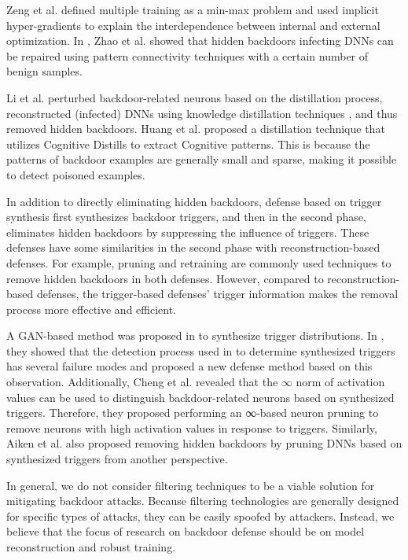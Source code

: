 \documentclass[conference]{IEEEtran}
\begin{document}
Zeng et al. \cite{b90}defined multiple training as a min-max problem and used implicit hyper-gradients to
explain the interdependence between internal and external optimization.
In \cite{b91}, Zhao et al. showed that hidden backdoors infecting DNNs can be repaired using pattern connectivity techniques with a certain number of benign samples.

Li et al. \cite{b92} perturbed backdoor-related neurons based on the distillation process, reconstructed (infected) DNNs using knowledge
distillation techniques , and thus removed hidden backdoors.
Huang et al. \cite{b109} proposed a distillation technique that utilizes Cognitive Distills to extract Cognitive patterns.
This is because the patterns of backdoor examples are generally small and sparse, making it possible to detect poisoned examples.


In addition to directly eliminating hidden backdoors, defense based on trigger synthesis first
synthesizes backdoor triggers, and then in the second phase, eliminates hidden backdoors by suppressing the influence of triggers.
These defenses have some similarities in the second phase with reconstruction-based defenses. For example,
pruning and retraining are commonly used techniques to remove hidden backdoors in both defenses. However,
compared to reconstruction-based defenses, the trigger-based defenses' trigger information makes the removal process more effective and efficient.

A GAN-based method was proposed in \cite{b93} to synthesize trigger distributions.
In \cite{b94}, they showed that the detection process used in \cite{b95} to determine synthesized
triggers has several failure modes and proposed a new defense method based on this observation.
Additionally, Cheng et al. \cite{b96} revealed that the $\infty$ norm of activation values can be used to
distinguish backdoor-related neurons based on synthesized triggers. Therefore, they proposed performing an
∞-based neuron pruning to remove neurons with high activation values in response to triggers.
Similarly, Aiken et al.\cite{b97} also proposed removing hidden backdoors
by pruning DNNs based on synthesized triggers from another perspective.

In general, we do not consider filtering techniques to be a viable solution for mitigating backdoor attacks.
Because filtering technologies are generally designed for specific types of attacks, they can be easily spoofed by attackers.
Instead, we believe that the focus of research on backdoor defense should be on model reconstruction and robust training.
\end{document}
